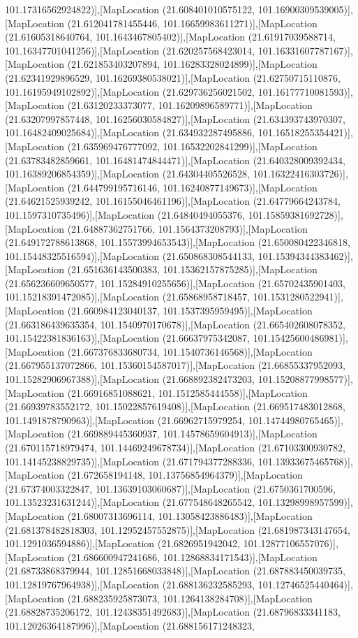 101.17316562924822)],[MapLocation (21.608401010575122, 101.16900309539005)],[MapLocation (21.612041781455446, 101.16659983611271)],[MapLocation (21.61605318640764, 101.1643467805402)],[MapLocation (21.61917039588714, 101.16347701041256)],[MapLocation (21.620257568423014, 101.16331607787167)],[MapLocation (21.621853403207894, 101.16283328024899)],[MapLocation (21.62341929896529, 101.16269380538021)],[MapLocation (21.62750715110876, 101.16195949102892)],[MapLocation (21.629736256021502, 101.16177710081593)],[MapLocation (21.63120233373077, 101.16209896589771)],[MapLocation (21.63207997857448, 101.16256030584827)],[MapLocation (21.634393743970307, 101.16482409025684)],[MapLocation (21.634932287495886, 101.16518255354421)],[MapLocation (21.635969476777092, 101.16532202841299)],[MapLocation (21.63783482859661, 101.16481474844471)],[MapLocation (21.640328009392434, 101.16389206854359)],[MapLocation (21.64304405526528, 101.16322416303726)],[MapLocation (21.644799195716146, 101.16240877149673)],[MapLocation (21.64621525939242, 101.16155046461196)],[MapLocation (21.64779664243784, 101.1597310735496)],[MapLocation (21.64840494055376, 101.15859381692728)],[MapLocation (21.64887362751766, 101.1564373208793)],[MapLocation (21.649172788613868, 101.15573994653543)],[MapLocation (21.650080422346818, 101.15448325516594)],[MapLocation (21.650868308544133, 101.15394344383462)],[MapLocation (21.651636143500383, 101.15362157875285)],[MapLocation (21.656236609650577, 101.15284910255656)],[MapLocation (21.65702435901403, 101.15218391472085)],[MapLocation (21.65868958718457, 101.1531280522941)],[MapLocation (21.660984123040137, 101.1537395959495)],[MapLocation (21.663186439635354, 101.1540970170678)],[MapLocation (21.665402608078352, 101.15422381836163)],[MapLocation (21.66637975342087, 101.15425600486981)],[MapLocation (21.667376833680734, 101.1540736146568)],[MapLocation (21.667955137072866, 101.15360154587017)],[MapLocation (21.66855337952093, 101.15282906967388)],[MapLocation (21.668892382473203, 101.15208877998577)],[MapLocation (21.66916851088621, 101.1512585444558)],[MapLocation (21.66939783552172, 101.15022857619408)],[MapLocation (21.669517483012868, 101.1491878790963)],[MapLocation (21.66962715979254, 101.14744980765465)],[MapLocation (21.669889445360937, 101.14578659604913)],[MapLocation (21.670115718979474, 101.14469249678734)],[MapLocation (21.67103300930782, 101.14145238829735)],[MapLocation (21.671794377288336, 101.13933675465768)],[MapLocation (21.672658194148, 101.13756854964379)],[MapLocation (21.67374003322847, 101.13639103060687)],[MapLocation (21.6750361700596, 101.13523231631244)],[MapLocation (21.677548648265542, 101.13298998957599)],[MapLocation (21.68007313696114, 101.13058423886483)],[MapLocation (21.681378482818303, 101.12952457552875)],[MapLocation (21.681987343147654, 101.1291036594886)],[MapLocation (21.6826951942042, 101.12877106557076)],[MapLocation (21.686600947241686, 101.12868834171543)],[MapLocation (21.68733868379944, 101.12851668033848)],[MapLocation (21.687883450039735, 101.12819767964938)],[MapLocation (21.688136232585293, 101.12746525440464)],[MapLocation (21.688235925873073, 101.1264138284708)],[MapLocation (21.68828735206172, 101.12438351492683)],[MapLocation (21.68796833341183, 101.12026364187996)],[MapLocation (21.688156171248323, 